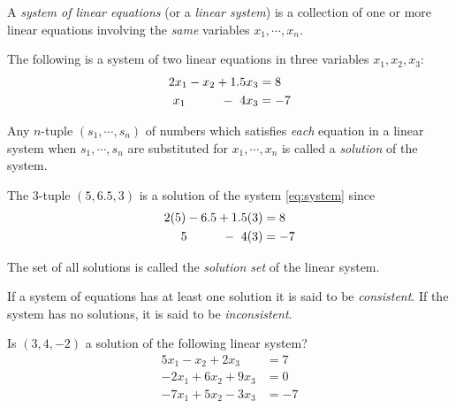 \documentclass[12pt,letterpaper,reqno]{article}
\numberwithin{equation}{section}
\newcommand{\ti}[1]{\textit{#1}}
\begin{document}
\begin{defn}\label{eq:system_of_linear_equations}
	A \ti{system of linear equations} (or a \ti{linear system}) is a collection of one or more linear equations involving the \ti{same} variables $x_1, \cdots, x_n$.	
\end{defn}

\begin{example}
The following is a system of two linear equations in three variables $x_1,x_2,x_3$:
\begin{equation}\label{eq:system}
\begin{split}
	2x_1-x_2+1.5x_3&=8 \\
	x_1  \hspace{1.0cm} - \ 4x_3&=-7
\end{split}
\end{equation}	
\end{example}

\begin{defn}[Solution]\label{def:solution}
	Any $n$-tuple $(s_1,\cdots,s_n)$ of numbers which satisfies \ti{each} equation in a linear system when $s_1,\cdots,s_n$ are substituted for $x_1,\cdots,x_n$ is called a \ti{solution} of the system.
\end{defn}

\begin{example}
The 3-tuple $(5,6.5,3)$ is a solution of the system \eqref{eq:system} since
	\begin{equation*}
\begin{split}
	2(5)-6.5+1.5(3)&=8 \\
	5  \hspace{1.0cm} - \ 4(3)&=-7
\end{split}
\end{equation*}	
\end{example}

\begin{defn} \label{def:solution_set}
The set of all solutions is called the \ti{solution set} of the linear system.	
\end{defn}

\begin{defn}\label{def:consistent}
If a system of equations has at least one solution it is said to be \emph{consistent}. If the system has no solutions, it is said to be \emph{inconsistent}.	
\end{defn}

\begin{exercise}
Is $(3,4,-2)$ a solution of the following linear system?
\begin{align*}
	5x_1-x_2+2x_3 &=7 \\
	-2x_1+6x_2+9x_3&=0 \\
	-7x_1+5x_2-3x_3&=-7
\end{align*} 	
\end{exercise}
\end{document}
